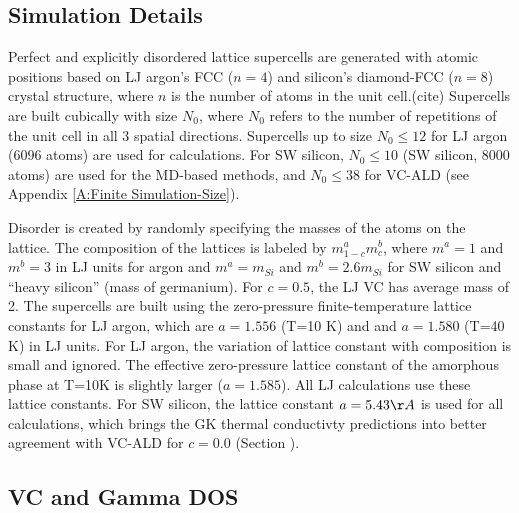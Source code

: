 \documentclass[aps,prb,twocolumn,superscriptaddress,amsmath,amssymb,floatfix]{revtex4}
\begin{document}
\subsection{\label{S:VC Gamma DOS}Simulation Details}

Perfect and explicitly disordered lattice supercells are generated 
with atomic positions 
based on LJ argon's FCC ($n=4$) and silicon's diamond-FCC ($n=8$) 
crystal structure, where $n$ is the number of atoms 
in the unit cell.(cite)  
Supercells are built cubically with size $N_0$, where $N_0$ refers to the 
number of repetitions of the unit cell in all 3 
spatial directions. Supercells up to size $N_0 \le 12$ 
for LJ argon (6096 atoms) are used for calculations. For SW silicon, 
$N_0 \le 10$ (SW silicon, 8000 atoms) are used for 
the MD-based methods, and $N_0 \le 38$ for VC-ALD 
(see Appendix \ref{A:Finite Simulation-Size}).  

Disorder is created by randomly specifying the masses of the atoms 
on the lattice. 
The composition of the lattices is labeled by $m^a_{1-c}m^b_{c}$,  
where $m^a=1$ and $m^b=3$ in 
LJ units for argon and $m^a=m_{Si}$ and $m^b=2.6m_{Si}$ 
for SW silicon and ``heavy silicon'' (mass of germanium). 
For $c=0.5$, the LJ VC has average mass of 2. 
The supercells are built using 
the zero-pressure finite-temperature lattice constants 
for LJ argon, which are $a=1.556$ (T=10 K) and 
and $a=1.580$ (T=40 K) in LJ units.\cite{mcgaughey_phonon_2004} 
For LJ argon, the variation of lattice constant 
with composition is small and ignored. 
The effective zero-pressure lattice constant 
of the amorphous phase at T=10K is slightly larger 
($a = 1.585$).\cite{mcgaughey_phonon_2004}  
All LJ calculations use these lattice constants. 
For SW silicon, the lattice constant $a=5.43 \AA$ is used 
for all calculations, which brings the GK thermal conductivty 
predictions\cite{goicochea_thermal_2010} 
into better agreement with VC-ALD
\cite{sellan_cross-plane_2010} for $c=0.0$ (Section ).

\subsection{\label{S:VC Gamma DOS}VC and Gamma DOS}
\end{document}
